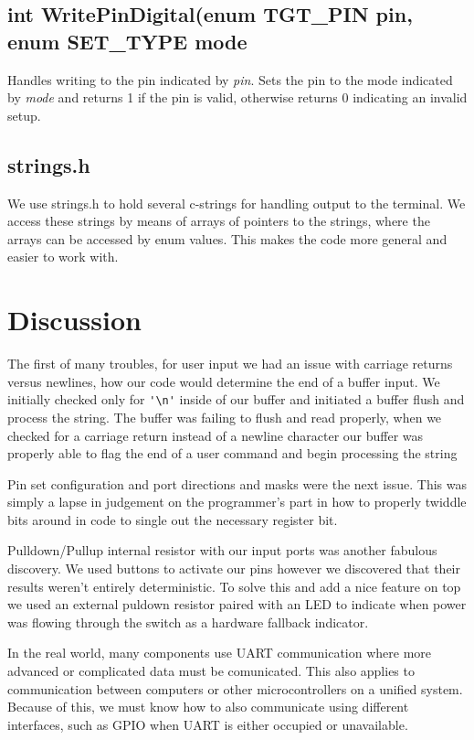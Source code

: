 \documentclass[letterpaper,11pt]{texMemo} %
\begin{document}
\subsection*{int WritePinDigital(enum TGT\_PIN pin, enum SET\_TYPE mode}
Handles writing to the pin indicated by \textit{pin}. Sets the pin to the mode indicated by \textit{mode} and returns 1 if the pin is valid, otherwise returns 0 indicating an invalid setup.
\subsection*{strings.h}
We use strings.h to hold several c-strings for handling output to the terminal. We access these strings by means of arrays of pointers to the strings, where the arrays can be accessed by enum values. This makes the code more general and easier to work with.

\section*{Discussion}

    The first of many troubles, for user input we had an issue with carriage returns versus newlines, 
how our code would determine the end of a buffer input. We initially checked only for \verb+'\n'+ inside of our
buffer and initiated a buffer flush and process the string. The buffer was failing to flush and read properly,
when we checked for a carriage return instead of a newline character our buffer was properly able to flag the 
end of a user command and begin processing the string
    
    Pin set configuration and port directions and masks were the next issue. This was simply a lapse in judgement
on the programmer's part in how to properly twiddle bits around in code to single out the necessary register bit.

    Pulldown/Pullup internal resistor with our input ports was another fabulous discovery. We used buttons to 
activate our pins however we discovered that their results weren't entirely deterministic. To solve this and add
a nice feature on top we used an external puldown resistor paired with an LED to indicate when power was flowing
through the switch as a hardware fallback indicator.

    In the real world, many components use UART communication where more advanced or complicated data must be 
comunicated. This also applies to communication between computers or other microcontrollers on a unified system.
Because of this, we must know how to also communicate using different interfaces, such as GPIO when UART is either
occupied or unavailable. 
\end{document}
